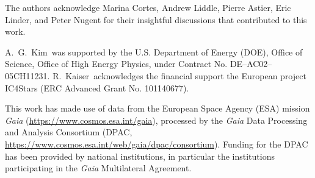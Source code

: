\documentclass[linenumbers,trackchanges]{aastex701}
\begin{document}
\begin{acknowledgments}
The authors acknowledge Marina Cortes, Andrew Liddle, Pierre Astier, Eric Linder, and Peter Nugent for their insightful discussions that contributed to this work.

A.~G.~Kim\ was supported by the U.S. Department of Energy (DOE), Office
of Science, Office of High Energy Physics, under Contract No. DE–AC02–05CH11231.
R.~Kaiser\ acknowledges the financial support the European project IC4Stars (ERC Advanced Grant No. 101140677).

This work has made use of data from the European Space Agency (ESA) mission
{\it Gaia} (\url{https://www.cosmos.esa.int/gaia}), processed by the {\it Gaia}
Data Processing and Analysis Consortium (DPAC,
\url{https://www.cosmos.esa.int/web/gaia/dpac/consortium}). Funding for the DPAC
has been provided by national institutions, in particular the institutions
participating in the {\it Gaia} Multilateral Agreement.
\end{acknowledgments}




\end{document}
